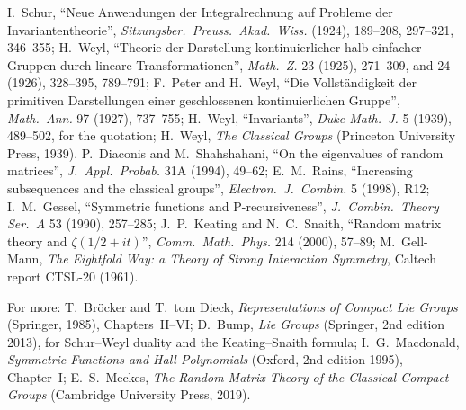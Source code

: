 I.~Schur, ``Neue Anwendungen der Integralrechnung auf Probleme der Invariantentheorie'', \emph{Sitzungsber.\ Preuss.\ Akad.\ Wiss.} (1924), 189--208, 297--321, 346--355; H.~Weyl, ``Theorie der Darstellung kontinuierlicher halb-einfacher Gruppen durch lineare
Transformationen'', \emph{Math.\ Z.} 23 (1925), 271--309, and 24 (1926), 328--395, 789--791; F.~Peter and H.~Weyl, ``Die Vollständigkeit der primitiven Darstellungen einer geschlossenen kontinuierlichen Gruppe'', \emph{Math.\ Ann.} 97 (1927), 737--755;
H.~Weyl, ``Invariants'', \emph{Duke Math.\ J.} 5 (1939), 489--502, for the quotation; H.~Weyl, \emph{The Classical Groups} (Princeton University Press, 1939). P.~Diaconis and M.~Shahshahani, ``On the eigenvalues of random matrices'', \emph{J.\ Appl.\ Probab.} 31A (1994), 49--62;
E.~M.~Rains, ``Increasing subsequences and the classical groups'', \emph{Electron.\ J.\ Combin.} 5 (1998), R12; I.~M.~Gessel, ``Symmetric functions and P-recursiveness'', \emph{J.\ Combin.\ Theory Ser.\ A} 53 (1990), 257--285; J.~P.~Keating and N.~C.~Snaith, ``Random matrix
theory and $\zeta(1/2+it)$'', \emph{Comm.\ Math.\ Phys.} 214 (2000), 57--89; M.~Gell-Mann, \emph{The Eightfold Way: a Theory of Strong Interaction Symmetry}, Caltech report CTSL-20 (1961).

For more: T.~Bröcker and T.~tom Dieck, \emph{Representations of Compact Lie Groups} (Springer, 1985), Chapters~II--VI; D.~Bump, \emph{Lie Groups} (Springer, 2nd edition 2013), for Schur--Weyl duality and the Keating--Snaith formula; I.~G.~Macdonald, \emph{Symmetric Functions and
Hall Polynomials} (Oxford, 2nd edition 1995), Chapter~I; E.~S.~Meckes, \emph{The Random Matrix Theory of the Classical Compact Groups} (Cambridge University Press, 2019).

